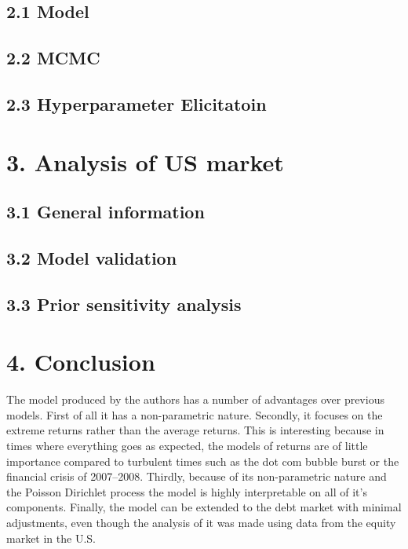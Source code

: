 \documentclass[a4paper]{report}
\begin{document}
\subsection*{2.1 Model}


\subsection*{2.2 MCMC}


\subsection*{2.3 Hyperparameter Elicitatoin}




\section*{3. Analysis of US market}


\subsection*{3.1 General information}


\subsection*{3.2 Model validation}


\subsection*{3.3 Prior sensitivity analysis}


\section*{4. Conclusion}
The model produced by the authors has a number of advantages over previous models. First of all it has a non-parametric nature. Secondly, it focuses on the extreme returns rather than the average returns. This is interesting because in times where everything goes as expected, the models of returns are of little importance compared to turbulent times such as the dot com bubble burst or the financial crisis of 2007–2008. Thirdly, because of its non-parametric nature and the Poisson Dirichlet process the model is highly interpretable on all of it's components. Finally, the model can be extended to the debt market with minimal adjustments, even though the analysis of it was made using data from the equity market in the U.S.


\end{document}
